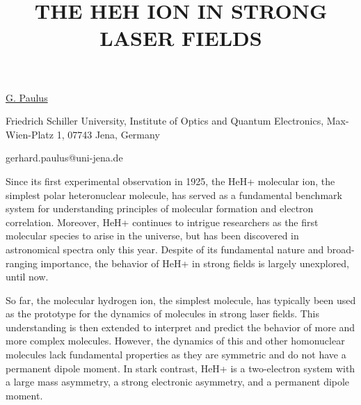 \title{THE HEH ION IN STRONG LASER FIELDS}

\underline{G. Paulus}  

{\normalsize{\vspace{-4mm}
Friedrich Schiller University,
Institute of Optics and Quantum Electronics,
Max-Wien-Platz 1,
07743 Jena,
Germany



\email gerhard.paulus@uni-jena.de}}

Since its first experimental observation in 1925, the HeH+ molecular ion, the simplest polar heteronuclear molecule, has served as a fundamental benchmark system for understanding principles of molecular formation and electron correlation. Moreover, HeH+ continues to intrigue researchers as the first molecular species to arise in the universe, but has been discovered in astronomical spectra only this year. Despite of its fundamental nature and broad-ranging importance, the behavior of HeH+ in strong fields is largely unexplored, until now.

So far, the molecular hydrogen ion, the simplest molecule, has typically been used as the prototype for the dynamics of molecules in strong laser fields. This understanding is then extended to interpret and predict the behavior of more and more complex molecules. However, the dynamics of this and other homonuclear molecules lack fundamental properties as they are symmetric and do not have a permanent dipole moment. In stark contrast, HeH+ is a two-electron system with a large mass asymmetry, a strong electronic asymmetry, and a permanent dipole moment.

